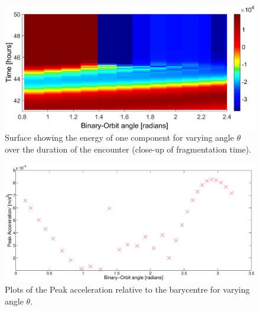 \documentclass[letterpaper, preprint, paper,11pt]{AAS}	%
\begin{document}
 \begin{figure}[H]
\centering
\centerline{\includegraphics[width=\textwidth]{phasing_energy_zoom.eps}} 
\caption{Surface showing the energy of one component for varying angle $\theta$ over the duration of the encounter (close-up of fragmentation time).} 
\label{fig:phase_zoom}
\end{figure} 
 \begin{figure}[H]
\centering
\centerline{\includegraphics[width=1.2\textwidth]{theta_sens.eps}} 
\caption{Plots of the Peak acceleration relative to the barycentre for varying angle $\theta$.} 
\label{fig:theta}
\end{figure}
\end{document}

